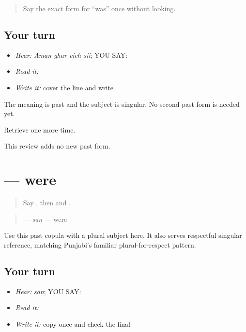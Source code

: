 \begin{quote}
Say the exact form for “was” once without looking.
\end{quote}

\subsection*{Your turn}
\begin{itemize}
\raggedright
  \item \emph{Hear:} \emph{Aman ghar vich sii}; YOU SAY: \textbf{   }
  \item \emph{Read it:} \textbf{   }
  \item \emph{Write it:} cover the line and write \textbf{}
\end{itemize}

The meaning is past and the subject is singular. No second past form is needed yet.

\begin{tcolorbox}[breakable,colback=teal!4,colframe=teal!35!black,title={Before you move on}]
Retrieve \textbf{} one more time.

This review adds no new past form.
\end{tcolorbox}
\section[\texorpdfstring{\pa{ਸਨ} (san)}{ਸਨ (san)}]{ — were}

\label{lesson:PA-C187-san}



\begin{quote}
Say \textbf{}, then \textbf{} and \textbf{}.
\end{quote}

\begin{grammarlens}[title={Grammar Lens: the plural and polite past form}]
\begin{quote}
\textbf{} — \emph{san} — were
\end{quote}

Use this past copula with a plural subject here. It also serves respectful singular reference, matching Punjabi’s familiar plural-for-respect pattern.
\end{grammarlens}

\subsection*{Your turn}
\begin{itemize}
\raggedright
  \item \emph{Hear:} \emph{san}; YOU SAY: \textbf{}
  \item \emph{Read it:} \textbf{  }
  \item \emph{Write it:} copy \textbf{} once and check the final \textbf{}
\end{itemize}

